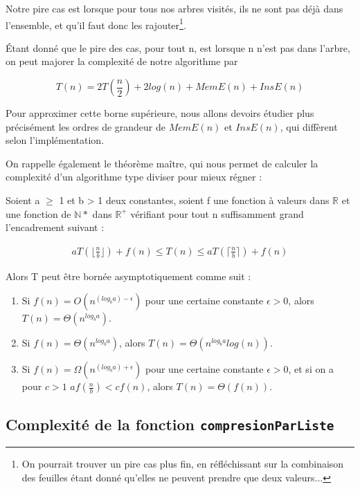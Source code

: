 \documentclass[12pt,a4paper]{article}
\begin{document}
Notre pire cas est lorsque pour tous nos arbres visités, ils ne sont pas déjà dans l'ensemble, et qu'il faut donc les rajouter\footnote{On pourrait trouver un pire cas plus fin, en réfléchissant sur la combinaison des feuilles étant donné qu'elles ne peuvent prendre que deux valeurs...}.


Étant donné que le pire des cas, pour tout n, est lorsque n n'est pas dans l'arbre, on peut majorer la complexité de notre algorithme par 

$$
T(n) = 2 T(\frac{n}{2}) + 2log(n) + MemE(n) + InsE(n)
$$

Pour approximer cette borne supérieure, nous allons devoirs étudier plus précisément les ordres de grandeur de $MemE(n)$ et $InsE(n)$, qui diffèrent selon l'implémentation.

On rappelle également le théorème maître, qui nous permet de calculer la complexité d'un algorithme type diviser pour mieux régner : 


\begin{tcolorbox}

Soient a $\geq$ 1 et b > 1 deux constantes, soient f une fonction à valeurs dans $\mathbb{R}$ et une fonction de $\mathbb{N}*$ dans $\mathbb{R}^+$ vérifiant pour tout n suffisamment grand l'encadrement suivant : 


\begin{align}
aT(\lfloor\frac{n}{b}\rfloor) + f(n)\leq T(n) \leq aT(\lceil\frac{n}{b}\rceil) + f(n)
\end{align}

Alors T peut être bornée asymptotiquement comme suit : 

\begin{enumerate}
\item Si $f(n) = O(n^{(log_b a)- \epsilon})$ pour une certaine constante $\epsilon > 0$, alors $T (n) = \Theta(n^{log_b a})$. \label{th1}
\item Si $f (n) = \Theta(n^{log_b a})$, alors $T (n) = \Theta(n^{log_b a} log (n))$. \label{th2}
\item Si $f (n) = \Omega(n^{(log_b a)+\epsilon})$ pour une certaine constante $\epsilon > 0$, et si on a pour $c > 1$ $af(\frac{n}{b}) < cf(n)$, alors $T (n) = \Theta(f(n))$. \label{th3}
\end{enumerate}




\end{tcolorbox}


\subsection{Complexité de la fonction \texttt{compresionParListe}}
\end{document}
